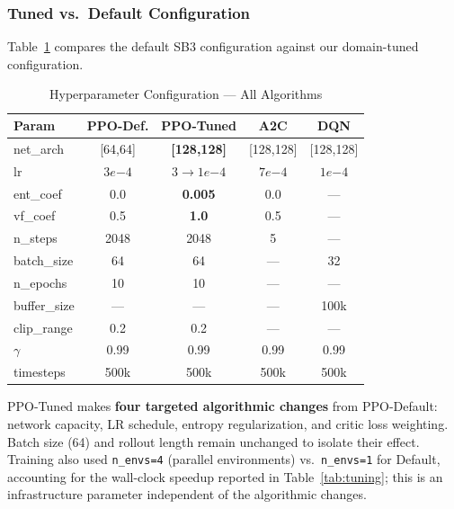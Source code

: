 \documentclass[conference]{IEEEtran}
\begin{document}
\subsubsection{Tuned vs.\ Default Configuration}

Table~\ref{tab:hyperparam} compares the default SB3 configuration against
our domain-tuned configuration.

\begin{table}[htbp]
\caption{Hyperparameter Configuration --- All Algorithms}
\label{tab:hyperparam}
\centering
\scriptsize
\setlength{\tabcolsep}{3pt}
\begin{tabular}{lcccc}
\toprule
\textbf{Param} & \textbf{PPO-Def.} & \textbf{PPO-Tuned} & \textbf{A2C} & \textbf{DQN} \\
\midrule
net\_arch    & [64,64]  & \textbf{[128,128]}          & [128,128] & [128,128] \\
lr           & $3e{-4}$ & \textbf{$3{\to}1e{-4}$}     & $7e{-4}$  & $1e{-4}$ \\
ent\_coef    & 0.0      & \textbf{0.005}               & 0.0       & --- \\
vf\_coef     & 0.5      & \textbf{1.0}                 & 0.5       & --- \\
n\_steps     & 2048     & 2048                         & 5         & --- \\
batch\_size  & 64       & 64                           & ---       & 32 \\
n\_epochs    & 10       & 10                           & ---       & --- \\
buffer\_size & ---      & ---                          & ---       & 100k \\
clip\_range  & 0.2    & 0.2                          & ---       & --- \\
$\gamma$     & 0.99     & 0.99                         & 0.99      & 0.99 \\
timesteps    & 500k     & 500k                         & 500k      & 500k \\
\bottomrule
\end{tabular}
\end{table}

PPO-Tuned makes \textbf{four targeted algorithmic changes} from PPO-Default:
network capacity, LR schedule, entropy regularization, and critic loss
weighting. Batch size (64) and rollout length remain unchanged to isolate
their effect. Training also used \texttt{n\_envs=4} (parallel environments)
vs.\ \texttt{n\_envs=1} for Default, accounting for the wall-clock speedup
reported in Table~\ref{tab:tuning}; this is an infrastructure parameter
independent of the algorithmic changes.
\end{document}
